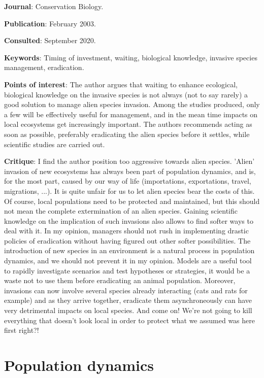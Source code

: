\documentclass[12pt,a4paper]{article}
\begin{document}
\textbf{Journal}: Conservation Biology.

\textbf{Publication}: February 2003.

\textbf{Consulted}: September 2020.

\textbf{Keywords}: Timing of investment, waiting, biological knowledge, invasive species management, eradication.

\textbf{Points of interest}: The author argues that waiting to enhance ecological, biological knowledge on the invasive species is not always (not to say rarely) a good solution to manage alien species invasion. Among the studies produced, only a few will be effectively useful for management, and in the mean time impacts on local ecosystems get increasingly important. The authors recommends acting as soon as possible, preferably eradicating the alien species before it settles, while scientific studies are carried out.

\textbf{Critique}: I find the author position too aggressive towards alien species. 'Alien' invasion of new ecosystems has always been part of population dynamics, and is, for the most part, caused by our way of life (importations, exportations, travel, migrations, ...). It is quite unfair for us to let alien species bear the costs of this. Of course, local populations need to be protected and maintained, but this should not mean the complete extermination of an alien species. Gaining scientific knowledge on the implication of such invasions also allows to find softer ways to deal with it. In my opinion, managers should not rush in implementing drastic policies of eradication without having figured out other softer possibilities. The introduction of new species in an environment is a natural process in population dynamics, and we should not prevent it in my opinion. Models are a useful tool to rapidly investigate scenarios and test hypotheses or strategies, it would be a waste not to use them before eradicating an animal population. Moreover, invasions can now involve several species already interacting (cats and rats for example) and as they arrive together, eradicate them asynchroneously can have very detrimental impacts on local species. And come on! We're not going to kill everything that doesn't look local in order to protect what we assumed was here first right?!

\newpage

\section*{Population dynamics}
\end{document}
